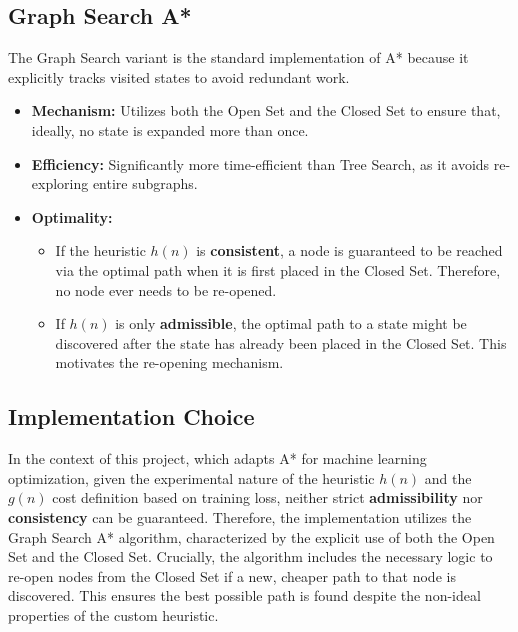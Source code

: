 \subsection{Graph Search A*}
The Graph Search variant is the standard implementation of A* because it explicitly tracks visited states to avoid redundant work.

\begin{itemize}
    \item \textbf{Mechanism:} Utilizes both the Open Set and the Closed Set to ensure that, ideally, no state is expanded more than once.
    \item \textbf{Efficiency:} Significantly more time-efficient than Tree Search, as it avoids re-exploring entire subgraphs.
    \item \textbf{Optimality:}
    \begin{itemize}
        \item If the heuristic $h(n)$ is \textbf{consistent}, a node is guaranteed to be reached via the optimal path when it is first placed in the Closed Set. Therefore, no node ever needs to be re-opened.
        \item If $h(n)$ is only \textbf{admissible}, the optimal path to a state might be discovered after the state has already been placed in the Closed Set. This motivates the re-opening mechanism.
    \end{itemize}
\end{itemize}

\subsection{Implementation Choice}
In the context of this project, which adapts A* for machine learning optimization, given the experimental nature of the heuristic $h(n)$ and the $g(n)$ cost definition based on training loss, neither strict \textbf{admissibility} nor \textbf{consistency} can be guaranteed.
Therefore, the implementation utilizes the Graph Search A* algorithm, characterized by the explicit use of both the Open Set and the Closed Set. Crucially, the algorithm includes the necessary logic to re-open nodes from the Closed Set if a new, cheaper path to that node is discovered. This ensures the best possible path is found despite the non-ideal properties of the custom heuristic.